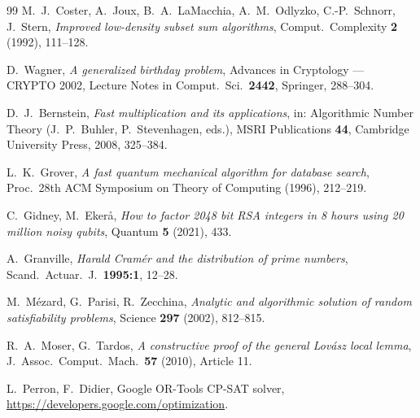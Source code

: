 \documentclass[11pt,oneside]{report}
\theoremstyle{plain}
\theoremstyle{definition}
\theoremstyle{remark}
\begin{document}
\begin{thebibliography}{99}
 M.~J.~Coster, A.~Joux, B.~A.~LaMacchia, A.~M.~Odlyzko,
C.-P.~Schnorr, J.~Stern, \emph{Improved low-density subset sum
algorithms}, Comput.\ Complexity \textbf{2} (1992), 111--128.

 D.~Wagner, \emph{A generalized birthday problem},
Advances in Cryptology --- CRYPTO 2002, Lecture Notes in Comput.\ Sci.\
\textbf{2442}, Springer, 288--304.

 D.~J.~Bernstein, \emph{Fast multiplication and its
applications}, in: Algorithmic Number Theory (J.~P.~Buhler,
P.~Stevenhagen, eds.), MSRI Publications \textbf{44}, Cambridge
University Press, 2008, 325--384.

 L.~K.~Grover, \emph{A fast quantum mechanical algorithm
for database search}, Proc.\ 28th ACM Symposium on Theory of Computing
(1996), 212--219.

 C.~Gidney, M.~Eker\aa, \emph{How to factor 2048 bit RSA
integers in 8 hours using 20 million noisy qubits}, Quantum \textbf{5}
(2021), 433.

 A.~Granville, \emph{Harald Cram\'er and the
distribution of prime numbers}, Scand.\ Actuar.\ J.\ \textbf{1995:1},
12--28.

 M.~M\'ezard, G.~Parisi, R.~Zecchina, \emph{Analytic and
algorithmic solution of random satisfiability problems}, Science
\textbf{297} (2002), 812--815.

 R.~A.~Moser, G.~Tardos, \emph{A constructive proof of the
general Lov\'asz local lemma}, J.\ Assoc.\ Comput.\ Mach.\ \textbf{57}
(2010), Article 11.

 L.~Perron, F.~Didier, Google OR-Tools
CP-SAT solver, \url{https://developers.google.com/optimization}.

\end{thebibliography}
\end{document}
